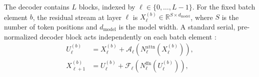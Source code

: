 \documentclass[11pt]{article}
\newcommand{\R}{\mathbb{R}}
\begin{document}
The decoder contains $L$ blocks, indexed by
$\ell\in\{0,\ldots,L-1\}$.  For the fixed batch element $b$, the residual stream
at layer $\ell$ is $X_\ell^{(b)}\in\R^{S\times d_{\mathrm{model}}}$, where $S$ is
the number of token positions and $d_{\mathrm{model}}$ is the model width.  A
standard serial, pre-normalized decoder block acts independently on each batch element
\citep{vaswani2017attention}:
\begin{align}
  U_\ell^{(b)}
  &= X_\ell^{(b)}
   + \mathcal{A}_\ell\!\left(N_{\ell}^{\mathrm{attn}}(X_\ell^{(b)})\right),
  \label{eq:attn-residual}
  \\
  X_{\ell+1}^{(b)}
  &= U_\ell^{(b)}
   + \mathcal{F}_\ell\!\left(N_{\ell}^{\mathrm{ffn}}(U_\ell^{(b)})\right),
  \label{eq:ffn-residual}
\end{align}
\end{document}
